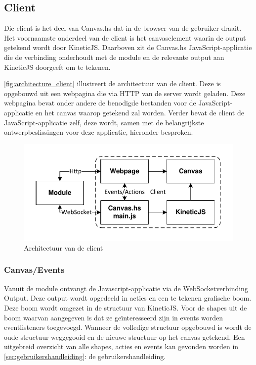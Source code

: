 
\subsection{Client}
Die client is het deel van Canvas.hs dat in de browser van de gebruiker draait. Het voornaamste onderdeel van de client is het canvaselement waarin de output getekend wordt door KineticJS. Daarboven zit de Canvas.hs JavaScript-applicatie die de verbinding onderhoudt met de module en de relevante output aan KineticJS doorgeeft om te tekenen.

\autoref{fig:architecture_client} illustreert de architectuur van de client. Deze is opgebouwd uit een webpagina die via HTTP van de server wordt geladen. Deze webpagina bevat onder andere de benodigde bestanden voor de JavaScript-applicatie en het canvas waarop getekend zal worden. Verder bevat de client de JavaScript-applicatie zelf, deze wordt, samen met de belangrijkste ontwerpbeslissingen voor deze applicatie, hieronder besproken.

\begin{figure}
\begin{center}
\includegraphics[keepaspectratio,width=\textwidth]{./images/client_architecture.pdf}
\caption{Architectuur van de client}
\label{fig:architecture_client}
\end{center}
\end{figure}

\subsubsection{Canvas/Events}
Vanuit de module ontvangt de Javascript-applicatie via de WebSocketverbinding Output. Deze output wordt opgedeeld in acties en een te tekenen grafische boom. Deze boom wordt omgezet in de structuur van KineticJS. Voor de shapes uit de boom waarvan aangegeven is dat ze ge\"interesseerd zijn in events worden eventlisteners toegevoegd. Wanneer de volledige structuur opgebouwd is wordt de oude structuur weggegooid en de nieuwe structuur op het canvas getekend. Een uitgebreid overzicht van alle shapes, acties en events kan gevonden worden in \autoref{sec:gebruikershandleiding}: de gebruikershandleiding.

